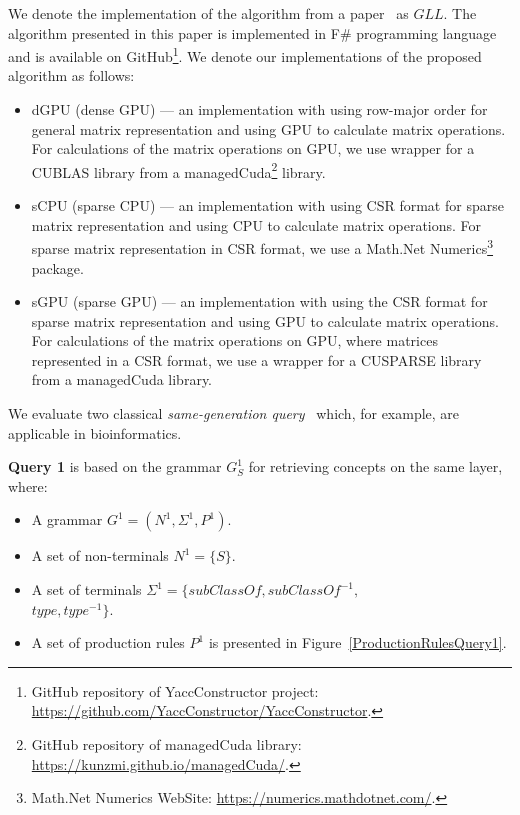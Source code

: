 We denote the implementation of the algorithm from a paper~\cite{GLL} as $GLL$. The algorithm presented in this paper is implemented in F\# programming language~\cite{fsharp} and is available on GitHub\footnote{GitHub repository of YaccConstructor project: \url{https://github.com/YaccConstructor/YaccConstructor}.}. We denote our implementations of the proposed algorithm as follows:
\begin{itemize}
    \item dGPU (dense GPU) --- an implementation with using row-major order for general matrix representation and using GPU to calculate matrix operations. For calculations of the matrix operations on GPU, we use wrapper for a CUBLAS library from a managedCuda\footnote{GitHub repository of managedCuda library: \url{https://kunzmi.github.io/managedCuda/}.} library.
    \item sCPU (sparse CPU) --- an implementation with using CSR format for sparse matrix representation and using CPU to calculate matrix operations. For sparse matrix representation in CSR format, we use a Math.Net Numerics\footnote{Math.Net Numerics WebSite: \url{https://numerics.mathdotnet.com/}.} package.
    \item sGPU (sparse GPU) --- an implementation with using the CSR format for sparse matrix representation and using GPU to calculate matrix operations. For calculations of the matrix operations on GPU, where matrices represented in a CSR format, we use a wrapper for a CUSPARSE library from a managedCuda library.
\end{itemize}

We evaluate two classical \textit{same-generation query}~\cite{FndDB} which, for example, are applicable in bioinformatics.

\textbf{Query 1} is based on the grammar $G^1_S$ for retrieving concepts on the same layer, where:
\begin{itemize}
    \item A grammar $G^1 = (N^1, \Sigma^1, P^1)$.
    \item A set of non-terminals $N^1 = \{S\}$.
    \item A set of terminals $\Sigma^1 = \{subClassOf, subClassOf^{-1},$ \\ $type, type^{-1}\}$.
    \item A set of production rules $P^1$ is presented in Figure~\ref{ProductionRulesQuery1}.
\end{itemize}

